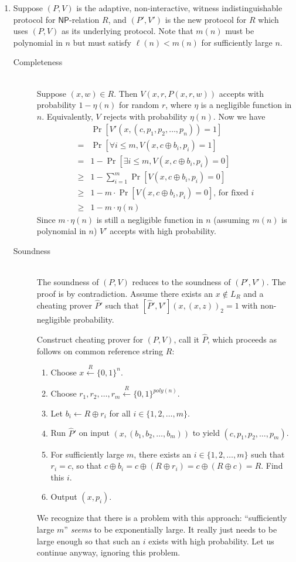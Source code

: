 \documentclass[draft]{article}
\newcommand{\class}[1]{{\ensuremath{\mathsf{#1}}}}
\newcommand{\getr}{\overset{R}{\gets}}
\newcommand{\getrn}{\getr\{0, 1\}^n}
\newcommand{\getrsingle}{\getr\{0, 1\}}
\newcommand{\getrpoly}{\getrsingle^{poly(n)}}
\newcommand{\NP}{\class{NP}}
\begin{document}
\begin{enumerate}
\item
  Suppose $(P, V)$ is the adaptive, non-interactive, witness indistinguishable protocol for $\NP$-relation $R$, and $(P', V')$ is the new protocol for $R$ which uses $(P, V)$ as its underlying protocol.
  Note that $m(n)$ must be polynomial in $n$ but must satisfy $\ell(n)< m(n)$ for sufficiently large $n$.
  \begin{description}
  \item[Completeness] \hfill \\
    Suppose $(x, w)\in R$.
    Then $V(x, r, P(x, r, w))$ accepts with probability $1-\eta(n)$ for random $r$, where $\eta$ is a negligible function in $n$.
    Equivalently, $V$ rejects with probability $\eta(n)$.
    Now we have
    \begin{align*}
           & \Pr\left[V'(x, (c, p_1, p_2, \dots, p_n)) = 1\right] \\
         = & \Pr\left[\forall i\leq m, V(x, c\oplus b_i, p_i) = 1\right] \\
         = & 1 - \Pr\left[\exists i\leq m, V(x, c\oplus b_i, p_i) = 0\right] \\
      \geq & 1 - \sum_{i=1}^m \Pr\left[V(x, c\oplus b_i, p_i) = 0\right] \\
      \geq & 1 - m \cdot \Pr\left[V(x, c\oplus b_i, p_i) = 0\right]\text{, for fixed } i\\
      \geq & 1 - m\cdot\eta(n)
    \end{align*}
    Since $m\cdot\eta(n)$ is still a negligible function in $n$ (assuming $m(n)$ is polynomial in $n$) $V'$ accepts with high probability.
  \item[Soundness] \hfill \\
    The soundness of $(P, V)$ reduces to the soundness of $(P', V')$.
    The proof is by contradiction.
    Assume there exists an $x\notin L_R$ and a cheating prover $\hat{P}'$ such that $[\hat{P}', V'](x, (x, z))_2=1$ with non-negligible probability.

    Construct cheating prover for $(P, V)$, call it $\hat{P}$, which proceeds as follows on common reference string $R$:
    \begin{enumerate}
    \item Choose $x\getrn$.
    \item Choose $r_1,r_2,\ldots,r_m\getrpoly$.
    \item Let $b_i\gets R\oplus r_i$ for all $i\in\{1,2,\ldots, m\}$.
    \item Run $\hat{P}'$ on input $(x, (b_1, b_2, \ldots, b_m))$ to yield $(c, p_1, p_2, \ldots, p_m)$.
    \item
      For sufficiently large $m$, there exists an $i\in\{1, 2, \ldots, m\}$ such that $r_i=c$, so that $c\oplus b_i = c \oplus (R \oplus r_i) = c \oplus (R \oplus c) = R$.
      Find this $i$.
    \item Output $(x, p_i)$.
    \end{enumerate}
    We recognize that there is a problem with this approach: ``sufficiently large $m$'' \emph{seems} to be exponentially large.
    It really just needs to be large enough so that such an $i$ exists with high probability.
    Let us continue anyway, ignoring this problem.


\end{description}
\end{enumerate}
\end{document}
